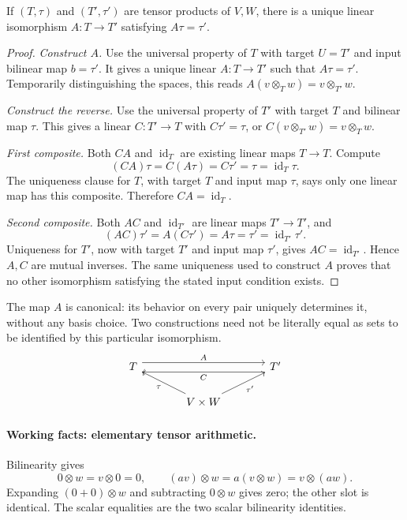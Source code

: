 \begin{theorem}\label{thm:tensor-uniqueness}
If $(T,\tau)$ and $(T',\tau')$ are tensor products of $V,W$, there is a
unique linear isomorphism $A:T\to T'$ satisfying $A\tau=\tau'$.
\end{theorem}
\begin{proof}
\emph{Construct $A$.} Use the universal property of $T$ with target
$U=T'$ and input bilinear map $b=\tau'$. It gives a unique linear
$A:T\to T'$ such that $A\tau=\tau'$. Temporarily distinguishing the
spaces, this reads $A(v\otimes_T w)=v\otimes_{T'}w$.

\emph{Construct the reverse.} Use the universal property of $T'$ with
target $T$ and bilinear map $\tau$. This gives a linear $C:T'\to T$
with $C\tau'=\tau$, or $C(v\otimes_{T'}w)=v\otimes_Tw$.

\emph{First composite.} Both $CA$ and $\operatorname{id}_T$ are existing
linear maps $T\to T$. Compute
\[
(CA)\tau=C(A\tau)=C\tau'=\tau=\operatorname{id}_T\tau.
\]
The uniqueness clause for $T$, with target $T$ and input map $\tau$, says
only one linear map has this composite. Therefore $CA=\operatorname{id}_T$.

\emph{Second composite.} Both $AC$ and $\operatorname{id}_{T'}$ are linear
maps $T'\to T'$, and
\[
(AC)\tau'=A(C\tau')=A\tau=\tau'=\operatorname{id}_{T'}\tau'.
\]
Uniqueness for $T'$, now with target $T'$ and input map $\tau'$, gives
$AC=\operatorname{id}_{T'}$. Hence $A,C$ are mutual inverses. The same
uniqueness used to construct $A$ proves that no other isomorphism satisfying
the stated input condition exists.
\end{proof}
The map $A$ is canonical: its behavior on every pair uniquely determines it,
without any basis choice. Two constructions need not be literally equal
as sets to be identified by this particular isomorphism.
\[
\begin{tikzcd}[column sep=large]
T\arrow[rr,shift left=1ex,"A"]&&T'\arrow[ll,shift left=1ex,"C"]\\
&V\times W\arrow[ul,"\tau"]\arrow[ur,"\tau'"']&
\end{tikzcd}
\]


\paragraph{Working facts: elementary tensor arithmetic.}
Bilinearity gives
\[
0\otimes w=v\otimes0=0,\qquad
(av)\otimes w=a(v\otimes w)=v\otimes(aw).
\]
Expanding $(0+0)\otimes w$ and subtracting $0\otimes w$ gives zero;
the other slot is identical. The scalar equalities are the two scalar
bilinearity identities.

